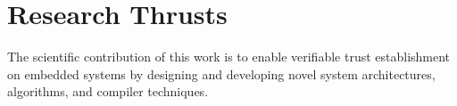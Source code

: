 \section{Research Thrusts}
The scientific contribution of this work is to enable verifiable trust establishment on embedded systems by designing and developing novel system architectures, algorithms, and compiler techniques.







